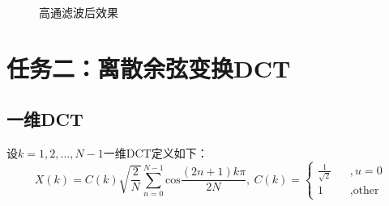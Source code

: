 \documentclass[UTF8]{ctexart}
\begin{document}
\begin{figure}[]
		\caption{高通滤波后效果}
		\end{figure}

	\section{任务二：离散余弦变换DCT}
		\subsection{一维DCT}
			设$k=1,2,\ldots,N-1$一维DCT定义如下：
			\[
				X(k) = C(k)\sqrt{\frac{2}{N}}\sum_{n=0}^{N-1}\textrm{cos}\frac{(2n+1)k\pi}{2N},\ C(k)=\left\{
				\begin{array}{lcl}
				\frac{1}{\sqrt{2}} &&, {u = 0}\\
				1 &&, {\textrm{other}}
				\end{array}
				\right.
			\]
\end{document}

